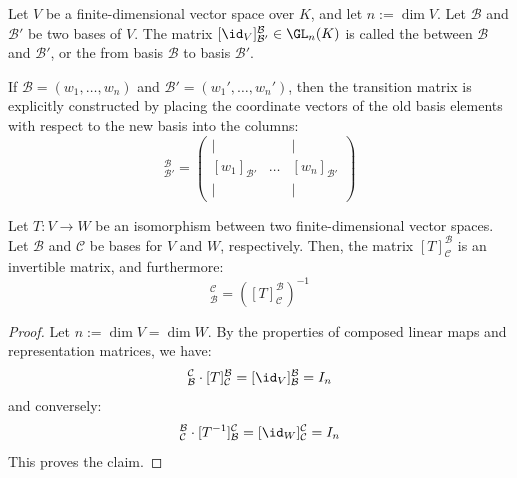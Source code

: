 \begin{definition}
\label{def:change_of_basis_matrix}
Let $V$ be a finite-di\-men\-sional vector space over $K$, and let $n := \dim V$. Let $\mathcal{B}$ and $\mathcal{B}'$ be two bases of $V$. The matrix $[\id_V]_{\mathcal{B}'}^{\mathcal{B}} \in \GL_n(K)$ is called the  between $\mathcal{B}$ and $\mathcal{B}'$, or the  from basis $\mathcal{B}$ to basis $\mathcal{B}'$.
\end{definition}

\begin{remark}
If $\mathcal{B} = (w_1, \dots, w_n)$ and $\mathcal{B}' = (w_1', \dots, w_n')$, then the transition matrix is explicitly constructed by placing the coordinate vectors of the old basis elements with respect to the new basis into the columns:
\begin{equation*}
    [\id_V]_{\mathcal{B}'}^{\mathcal{B}} = \begin{pmatrix} | & & | \\ [w_1]_{\mathcal{B}'} & \dots & [w_n]_{\mathcal{B}'} \\ | & & | \end{pmatrix}
\end{equation*}
\end{remark}

\begin{proposition}
\label{prop:representation_of_isomorphisms}
Let $T: V \to W$ be an isomorphism between two finite-di\-men\-sional vector spaces. Let $\mathcal{B}$ and $\mathcal{C}$ be bases for $V$ and $W$, respectively. Then, the matrix $[T]_{\mathcal{C}}^{\mathcal{B}}$ is an invertible matrix, and furthermore:
\begin{equation*}
    [T^{-1}]_{\mathcal{B}}^{\mathcal{C}} = ([T]_{\mathcal{C}}^{\mathcal{B}})^{-1}
\end{equation*}
\end{proposition}

\begin{proof}
Let $n := \dim V = \dim W$. By the properties of composed linear maps and representation matrices, we have:
\begin{equation*}
    [T^{-1}]_{\mathcal{B}}^{\mathcal{C}} \cdot [T]_{\mathcal{C}}^{\mathcal{B}} = [\id_V]_{\mathcal{B}}^{\mathcal{B}} = I_n
\end{equation*}
and conversely:
\begin{equation*}
    [T]_{\mathcal{C}}^{\mathcal{B}} \cdot [T^{-1}]_{\mathcal{B}}^{\mathcal{C}} = [\id_W]_{\mathcal{C}}^{\mathcal{C}} = I_n
\end{equation*}
This proves the claim.
\end{proof}

